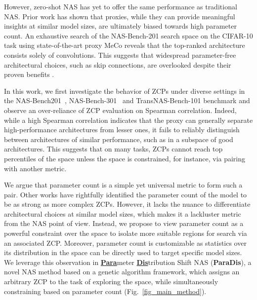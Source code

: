 \documentclass[10pt]{article} %
\begin{document}
However, zero-shot NAS has yet to offer the same performance as traditional NAS. Prior work \citep{kadlecova2024surprisingly, krishnakumar2022bench} has shown that proxies, while they can provide meaningful insights at similar model sizes, are ultimately biased towards high parameter count. An exhaustive search of the NAS-Bench-201 search space \citep{dong2020bench} on the CIFAR-10 task \citep{krizhevsky2009learning} using state-of-the-art proxy MeCo \citep{jiang2023meco} reveals that the top-ranked architecture consists solely of convolutions. This suggests that widespread parameter-free architectural choices, such as skip connections, are overlooked despite their proven benefits \citep{he2015deep, orhan2017skip}.

In this work, we first investigate the behavior of ZCPs under diverse settings in the NAS-Bench201~\citep{dong2020bench}, NAS-Bench-301~\citep{siems2020bench} and TransNAS-Bench-101 benchmark \citep{duan2021transnas} and observe an over-reliance of ZCP evaluation on Spearman correlation. Indeed, while a high Spearman correlation indicates that the proxy can generally separate high-performance architectures from lesser ones, it fails to reliably distinguish between architectures of similar performance, such as in a subspace of good architectures. This suggests that on many tasks, ZCPs cannot reach top percentiles of the space unless the space is constrained, for instance, via pairing with another metric.

We argue that parameter count is a simple yet universal metric to form such a pair. Other works \citep{colin2022adeeperlook, javaheripi2022litetransformersearch} have rightfully identified the parameter count of the model to be as strong as more complex ZCPs. However, it lacks the nuance to differentiate architectural choices at similar model sizes, which makes it a lackluster metric from the NAS point of view. Instead, we propose to view parameter count as a powerful constraint over the space to isolate more suitable regions for search via an associated ZCP. Moreover, parameter count is customizable as statistics over its distribution in the space can be directly used to target specific model sizes. We leverage this observation in \underline{\textbf{Para}}meter \underline{\textbf{Dis}}tribution Shift NAS (\textbf{ParaDis}), a novel NAS method based on a genetic algorithm framework, which assigns an arbitrary ZCP to the task of exploring the space, while simultaneously constraining based on parameter count (Fig.~\ref{fig_main_method}).
\end{document}
